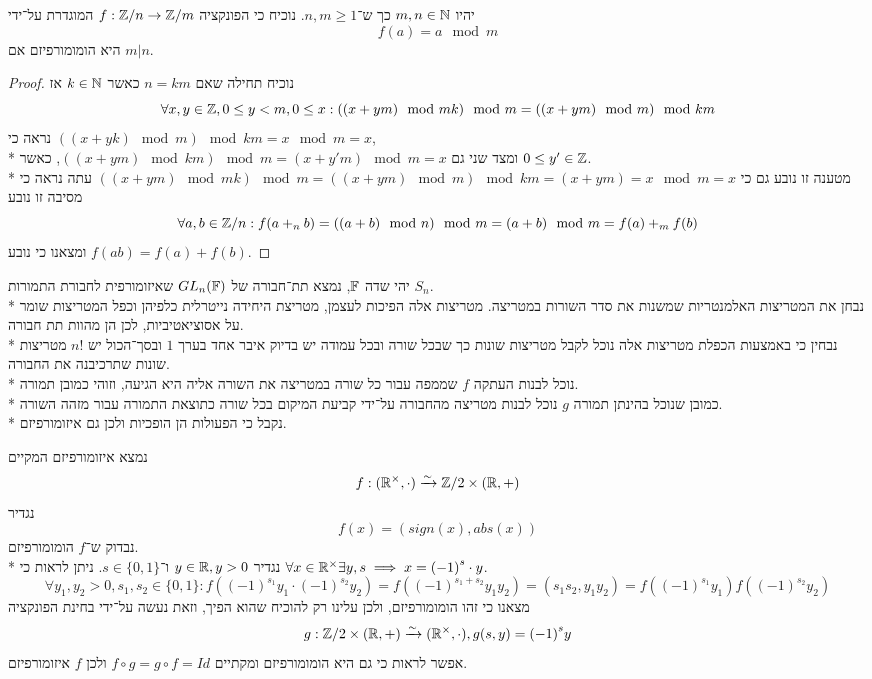 \Subquestion{}
יהיו $m, n \in \mathbb{N}$ כך ש־$n, m \ge 1$. נוכיח כי הפונקציה $f : \mathbb{Z}/n \to \mathbb{Z}/m$ המוגדרת על־ידי
\[
	f(a) = a \mod m
\]
היא הומומורפיזם אם $m|n$.
\begin{proof}
	נוכיח תחילה שאם $n = km$ כאשר $k \in \mathbb{N}$ אז 
	\[
		\forall x, y \in \mathbb{Z}, 0 \le y < m, 0 \le x : ((x + ym) \mod mk) \mod m = ((x + ym) \mod m) \mod km
	\]
	נראה כי $((x + yk) \mod m) \mod km = x \mod m = x$, \\*
	ומצד שני גם $((x + ym) \mod km) \mod m = (x + y'm) \mod m = x$, כאשר $0 \le y' \in \mathbb{Z}$. \\*
	מטענה זו נובע גם כי $((x + ym) \mod mk) \mod m = ((x + ym) \mod m) \mod km = (x + ym) = x \mod m = x$
	עתה נראה כי מסיבה זו נובע
	\[
		\forall a, b \in \mathbb{Z}/n : f(a +_n b)
		= ((a + b) \mod n) \mod m
		= (a + b) \mod m
		= f(a) +_m f(b)
	\]
	ומצאנו כי נובע $f(a b) = f(a) + f(b)$.
\end{proof}

\Question{}
\Subquestion{}
יהי שדה $\mathbb{F}$, נמצא תת־חבורה של $GL_n(\mathbb{F})$ שאיזומורפית לחבורת התמורות $S_n$. \\*
נבחן את המטריצות האלמנטריות שמשנות את סדר השורות במטריצה. מטריצות אלה הפיכות לעצמן, מטריצת היחידה נייטרלית כלפיהן וכפל המטריצות שומר על אסוציאטיביות, לכן הן מהוות תת חבורה. \\*
נבחין כי באמצעות הכפלת מטריצות אלה נוכל לקבל מטריצות שונות כך שבכל שורה ובכל עמודה יש בדיוק איבר אחד בערך $1$ ובסך־הכול יש $n! $ מטריצות שונות שתרכיבנה את החבורה. \\*
נוכל לבנות העתקה $f$ שממפה עבור כל שורה במטריצה את השורה אליה היא הגיעה, וזוהי כמובן תמורה. \\*
כמובן שנוכל בהינתן תמורה $g$ נוכל לבנות מטריצה מהחבורה על־ידי קביעת המיקום בכל שורה כתוצאת התמורה עבור מזהה השורה. \\*
נקבל כי הפעולות הן הופכיות ולכן גם איזומורפיזם.

\Subquestion{}
נמצא איזומורפיזם המקיים
\[
	f : (\mathbb{R}^\times, \cdot) \xrightarrow{\sim} \mathbb{Z}/2 \times (\mathbb{R}, +)
\]
נגדיר
\[
	f(x) = (sign(x), abs(x))
\]
נבדוק ש־$f$ הומומורפיזם. \\*
נגדיר $y \in \mathbb{R}, y > 0$ ו־$s \in \{0, 1\}$. ניתן לראות כי $\forall x \in \mathbb{R}^\times \exists y, s \implies x = {(-1)}^s \cdot y$.
\[
	\forall y_1, y_2 > 0, s_1, s_2 \in \{0, 1\} : f({(-1)}^{s_1} y_1 \cdot {(-1)}^{s_2} y_2) = f({(-1)}^{s_1 + s_2} y_1 y_2) = (s_1 s_2, y_1 y_2) = f({(-1)}^{s_1} y_1) f({(-1)}^{s_2} y_2)
\]
מצאנו כי זהו הומומורפיזם, ולכן עלינו רק להוכיח שהוא הפיך, וזאת נעשה על־ידי בחינת הפונקציה
\[
	g : \mathbb{Z}/2 \times (\mathbb{R}, +) \xrightarrow{\sim} (\mathbb{R}^\times, \cdot), g(s, y) = {(-1)}^s y
\]
אפשר לראות כי גם היא הומומורפיזם ומקתיים $f \circ g = g \circ f = Id$ ולכן $f$ איזומורפיזם.

